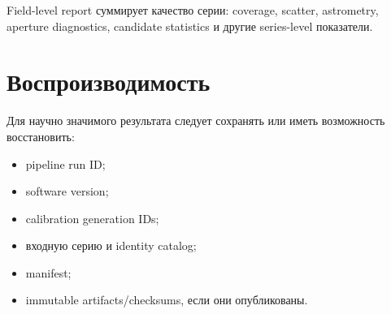 Field-level report суммирует качество серии: coverage, scatter, astrometry, aperture diagnostics, candidate statistics и другие series-level показатели.

\section{Воспроизводимость}

Для научно значимого результата следует сохранять или иметь возможность восстановить:

\begin{itemize}
  \item pipeline run ID;
  \item software version;
  \item calibration generation IDs;
  \item входную серию и identity catalog;
  \item manifest;
  \item immutable artifacts/checksums, если они опубликованы.
\end{itemize}
